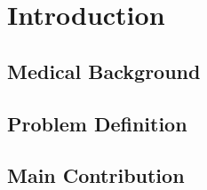 \documentclass[thesis.tex]{subfiles}
\begin{document}
\chapter{Introduction}
\label{chap:introduction}


\section{Medical Background}


\section{Problem Definition}

\section{Main Contribution}


\subfilebib %
\end{document}

